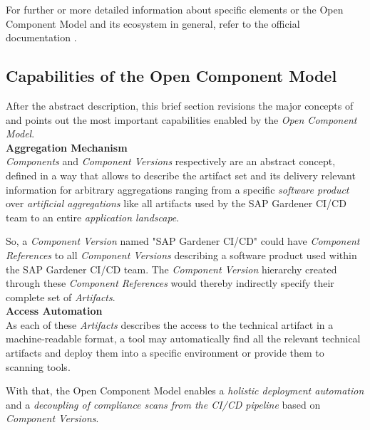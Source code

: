 For further or more detailed information about specific elements or the Open Component Model and its ecosystem in general, refer to the official documentation \cite{OCMSpec}.

\subsection{Capabilities of the Open Component Model}
After the abstract description, this brief section revisions the major concepts of and points out the most important capabilities enabled by the \emph{Open Component Model}.\\

\noindent\textbf{Aggregation Mechanism}\\
\emph{Components} and \emph{Component Versions} respectively are an abstract concept, defined in a way that allows to describe the artifact set and its delivery relevant information for arbitrary aggregations ranging from a specific \emph{software product} over \emph{artificial aggregations} like all artifacts used by the SAP Gardener CI/CD team to an entire \emph{application landscape}.\par
So, a \emph{Component Version} named "SAP Gardener CI/CD" could have \emph{Component References} to all \emph{Component Versions} describing a software product used within the SAP Gardener CI/CD team. The \emph{Component Version} hierarchy created through these \emph{Component References} would thereby indirectly specify their complete set of \emph{Artifacts}.\\

\noindent\textbf{Access Automation}\\
As each of these \emph{Artifacts} describes the access to the technical artifact in a machine-readable format, a tool may automatically find all the relevant technical artifacts and deploy them into a specific environment or provide them to scanning tools.\par
With that, the Open Component Model enables a \emph{holistic deployment automation} and a \emph{decoupling of compliance scans from the CI/CD pipeline} based on \emph{Component Versions}.\\ 

